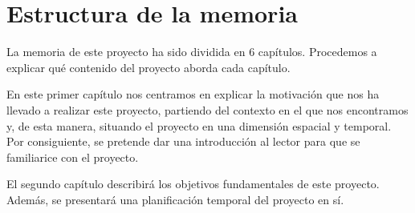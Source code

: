 \documentclass[a4paper, 12pt]{book}
\begin{document}

\section{Estructura de la memoria}
\label{sec:estructura}

La memoria de este proyecto ha sido dividida en 6 capítulos. Procedemos
a explicar qué contenido del proyecto aborda cada capítulo.

En este primer capítulo nos centramos en explicar la motivación que nos
ha llevado a realizar este proyecto, partiendo del contexto en el que
nos encontramos y, de esta manera, situando el proyecto en una dimensión
espacial y temporal. Por consiguiente, se pretende dar una introducción al
lector para que se familiarice con el proyecto.

El segundo capítulo describirá los objetivos fundamentales de este proyecto.
Además, se presentará una planificación temporal del proyecto en sí.
\end{document}

